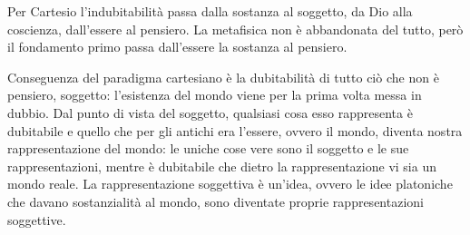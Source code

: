 \documentclass[a4paper,12pt,oneside]{article}%
\begin{document}
Per Cartesio l'indubitabilità passa dalla sostanza al soggetto, da Dio alla coscienza, dall'essere al pensiero. La metafisica non è abbandonata del tutto, però il fondamento primo passa dall'essere la sostanza al pensiero.

Conseguenza del paradigma cartesiano è la dubitabilità di tutto ciò che non è pensiero, soggetto: l'esistenza del mondo viene per la prima volta messa in dubbio. Dal punto di vista del soggetto, qualsiasi cosa esso rappresenta è dubitabile e quello che per gli antichi era l'essere, ovvero il mondo, diventa nostra rappresentazione del mondo: le uniche cose vere sono il soggetto e le sue rappresentazioni, mentre è dubitabile che dietro la rappresentazione vi sia un mondo reale. La rappresentazione soggettiva è un'idea, ovvero le idee platoniche che davano sostanzialità al mondo, sono diventate proprie rappresentazioni soggettive.



	
\end{document}
